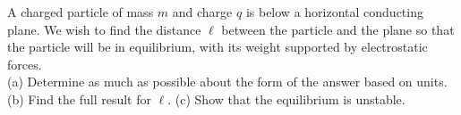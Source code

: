 A charged particle of mass $m$ and charge $q$ is
below a horizontal conducting plane. We wish to find the distance
$\ell$ between the particle and the plane so that the particle
will be in equilibrium, with its weight supported by electrostatic forces.\\
(a) Determine as much as possible about the form of the answer based
on units.\hwendpart
(b) Find the full result for $\ell$.\hwendpart
(c) Show that the equilibrium is unstable.

